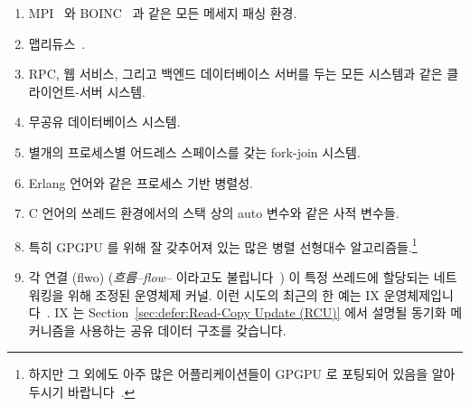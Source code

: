 \begin{enumerate}
\item	MPI~\cite{MPIForum2008} 와 BOINC~\cite{BOINC2008} 과 같은 모든 메세지
	패싱 환경.
\item	맵리듀스~\cite{MapReduce2008MIT}.
\item	RPC, 웹 서비스, 그리고 백엔드 데이터베이스 서버를 두는 모든 시스템과
	같은 클라이언트-서버 시스템.
\item	무공유 데이터베이스 시스템.
\item	별개의 프로세스별 어드레스 스페이스를 갖는 fork-join 시스템.
\item	Erlang 언어와 같은 프로세스 기반 병렬성.
\item	C 언어의 쓰레드 환경에서의 스택 상의 auto 변수와 같은 사적 변수들.
\item	특히 GPGPU 를 위해 잘 갖추어져 있는 많은 병렬 선형대수
	알고리즘들.\footnote{
		하지만 그 외에도 아주 많은 어플리케이션들이 GPGPU 로 포팅되어
		있음을 알아두시기
		바랍니다~\cite{NormMatloff2017ParProcBook,AMD2020ROCm,NVidia2017GPGPU,NVidia2017GPGPU-university}.}
\item	각 연결 (flwo) (\emph{흐름--flow--} 이라고도
	불립니다~\cite{Shenker89,ZhangPhD,McKenney90}) 이 특정 쓰레드에
	할당되는 네트워킹을 위해 조정된 운영체제 커널.
	이런 시도의 최근의 한 예는 IX
	운영체제입니다~\cite{Belay:2016:IOS:3014162.2997641}.
	IX 는
	Section~\ref{sec:defer:Read-Copy Update (RCU)}
	에서 설명될 동기화 메커니즘을 사용하는 공유 데이터 구조를 갖습니다.

\iffalse

\item	All message-passing environments, such as MPI~\cite{MPIForum2008}
	and BOINC~\cite{BOINC2008}.
\item	Map-reduce~\cite{MapReduce2008MIT}.
\item	Client-server systems, including RPC, web services, and
	pretty much any system with a back-end database server.
\item	Shared-nothing database systems.
\item	Fork-join systems with separate per-process address spaces.
\item	Process-based parallelism, such as the Erlang language.
\item	Private variables, for example, C-language on-stack auto variables,
	in threaded environments.
\item	Many parallel linear-algebra algorithms, especially those
	well-suited for GPGPUs.\footnote{
		But note that a great many other classes of applications
		have also been ported to
		GPGPUs~\cite{NormMatloff2017ParProcBook,AMD2020ROCm,NVidia2017GPGPU,NVidia2017GPGPU-university}.}
\item	Operating-system kernels adapted for networking, where each connection
	(also called \emph{flow}~\cite{Shenker89,ZhangPhD,McKenney90})
	is assigned to a specific thread.
	One recent example of this approach is the IX operating
	system~\cite{Belay:2016:IOS:3014162.2997641}.
	IX does have some shared data structures, which use synchronization
	mechanisms to be described in
	Section~\ref{sec:defer:Read-Copy Update (RCU)}.

\fi

\end{enumerate}

